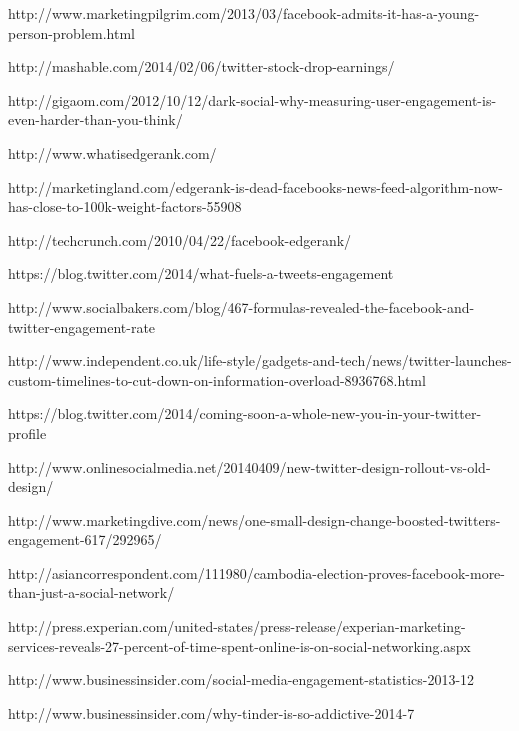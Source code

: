 \begin{thebibliography}{9}

http://www.marketingpilgrim.com/2013/03/facebook-admits-it-has-a-young-person-problem.html

http://mashable.com/2014/02/06/twitter-stock-drop-earnings/

http://gigaom.com/2012/10/12/dark-social-why-measuring-user-engagement-is-even-harder-than-you-think/

http://www.whatisedgerank.com/

http://marketingland.com/edgerank-is-dead-facebooks-news-feed-algorithm-now-has-close-to-100k-weight-factors-55908

http://techcrunch.com/2010/04/22/facebook-edgerank/


https://blog.twitter.com/2014/what-fuels-a-tweets-engagement

http://www.socialbakers.com/blog/467-formulas-revealed-the-facebook-and-twitter-engagement-rate


http://www.independent.co.uk/life-style/gadgets-and-tech/news/twitter-launches-custom-timelines-to-cut-down-on-information-overload-8936768.html

https://blog.twitter.com/2014/coming-soon-a-whole-new-you-in-your-twitter-profile

http://www.onlinesocialmedia.net/20140409/new-twitter-design-rollout-vs-old-design/

http://www.marketingdive.com/news/one-small-design-change-boosted-twitters-engagement-617/292965/


http://asiancorrespondent.com/111980/cambodia-election-proves-facebook-more-than-just-a-social-network/

http://press.experian.com/united-states/press-release/experian-marketing-services-reveals-27-percent-of-time-spent-online-is-on-social-networking.aspx

http://www.businessinsider.com/social-media-engagement-statistics-2013-12

http://www.businessinsider.com/why-tinder-is-so-addictive-2014-7


\end{thebibliography}
